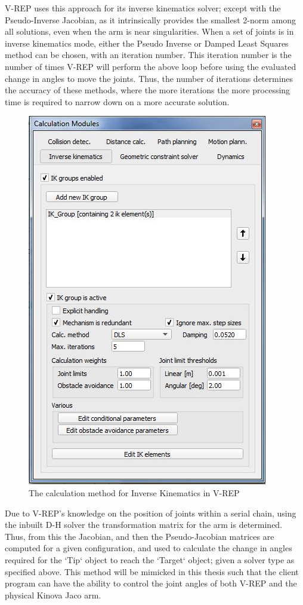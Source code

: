 \documentclass[12pt,openany,a4paper]{book}
\begin{document}
V-REP uses this approach for its inverse kinematics solver; except with the Pseudo-Inverse Jacobian, as it intrinsically provides the smallest 2-norm among all solutions, even when the arm is near singularities. When a set of joints is in inverse kinematics mode, either the Pseudo Inverse or Damped Least Squares method can be chosen, with an iteration number. This iteration number is the number of times V-REP will perform the above loop before using the evaluated change in angles to move the joints. Thus, the number of iterations determines the accuracy of these methods, where the more iterations the more processing time is required to narrow down on a more accurate solution.

\begin{center}
\begin{figure}[htb]
  \includegraphics[width=0.5\linewidth]{VREP_ik_dialog.jpg}
\caption{The calculation method for Inverse Kinematics in V-REP}
\end{figure}
\end{center}

Due to V-REP's knowledge on the position of joints within a serial chain, using the inbuilt D-H solver the transformation matrix for the arm is determined. Thus, from this the Jacobian, and then the Pseudo-Jacobian matrices are computed for a given configuration, and used to calculate the change in angles required for the `Tip` object to reach the `Target` object; given a solver type as specified above. This method will be mimicked in this thesis such that the client program can have the ability to control the joint angles of both V-REP and the physical Kinova Jaco arm.
\end{document}
